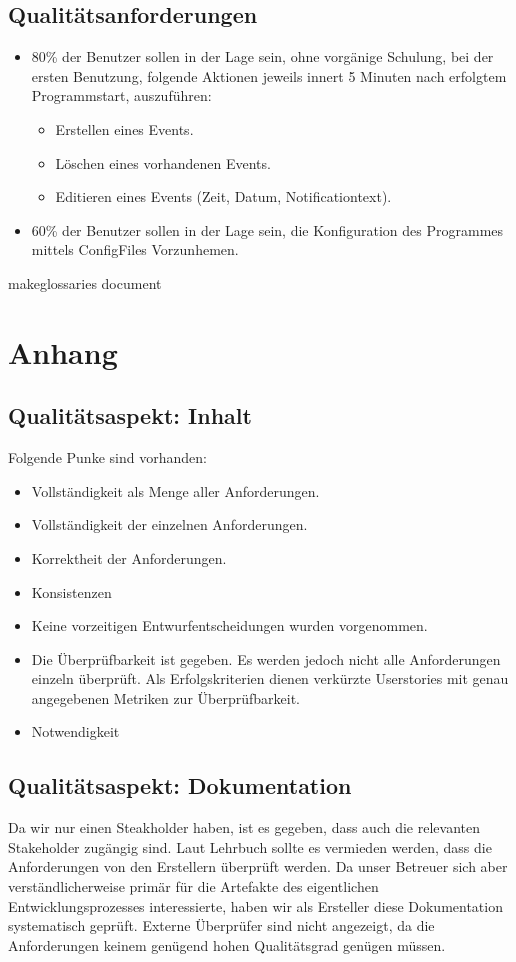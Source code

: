 \documentclass[11pt,titelpage]{scrartcl}
\begin{document}
\subsection{Qualitätsanforderungen}
\begin{itemize}
\item 80\% der Benutzer sollen in der Lage sein, ohne vorgänige Schulung, bei der ersten Benutzung, folgende Aktionen
jeweils innert 5 Minuten nach erfolgtem Programmstart, auszuführen:
\begin{itemize}
\item Erstellen eines Events.
\item Löschen eines vorhandenen Events.
\item Editieren eines Events (Zeit, Datum, Notificationtext).
\end{itemize}

\item 60\% der Benutzer sollen in der Lage sein, die Konfiguration des Programmes mittels ConfigFiles Vorzunhemen.
\end{itemize}makeglossaries document

\section{Anhang}
\listoffigures

\glsaddall
\printglossary
\subsection{Qualitätsaspekt: Inhalt}
Folgende Punke sind vorhanden:
\begin{itemize}
 \item Vollständigkeit als Menge aller Anforderungen.
 \item Vollständigkeit der einzelnen Anforderungen.
 \item Korrektheit der Anforderungen.
 \item Konsistenzen
 \item Keine vorzeitigen Entwurfentscheidungen wurden vorgenommen.
 \item Die Überprüfbarkeit ist gegeben. Es werden jedoch nicht alle Anforderungen einzeln überprüft. Als
 Erfolgskriterien dienen verkürzte Userstories mit genau angegebenen Metriken zur Überprüfbarkeit.
 \item Notwendigkeit
\end{itemize}
\subsection{Qualitätsaspekt: Dokumentation}
Da wir nur einen Steakholder haben, ist es gegeben, dass auch die relevanten Stakeholder zugängig sind. Laut Lehrbuch
sollte es vermieden werden, dass die Anforderungen von den Erstellern überprüft werden. Da unser Betreuer sich aber
verständlicherweise primär für die Artefakte des eigentlichen Entwicklungsprozesses interessierte, haben wir als
Ersteller diese Dokumentation systematisch geprüft. Externe Überprüfer sind nicht angezeigt, da die Anforderungen
keinem genügend hohen Qualitätsgrad genügen müssen.
\end{document}
